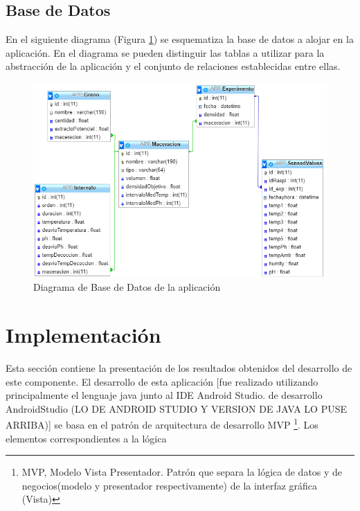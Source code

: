     \subsection{Base de Datos}
        \par En el siguiente diagrama (Figura \ref{fig:DiagramaBdApp}) se esquematiza la base de datos a alojar en la aplicación. En el diagrama se pueden distinguir las tablas a utilizar para la abstracción de la aplicación y el conjunto de relaciones establecidas entre ellas.
        
        \begin{figure}[h]
            \centering
            \includegraphics[scale=0.8]{DiagramaBaseDeDatosAPP.jpg}
            \caption{Diagrama de Base de Datos de la aplicación}
            \label{fig:DiagramaBdApp}
        \end{figure}

\section{Implementación}
    \par Esta sección contiene la presentación de los resultados obtenidos del desarrollo de este componente. 
    El desarrollo de esta aplicación [fue realizado utilizando principalmente el lenguaje java junto al IDE  Android Studio.
    de desarrollo AndroidStudio (LO DE ANDROID STUDIO Y VERSION DE JAVA LO PUSE ARRIBA)] se basa en el patrón de arquitectura de desarrollo MVP \footnote{MVP, Modelo Vista Presentador. Patrón que separa la lógica de datos y de negocios(modelo y presentador respectivamente) de la interfaz gráfica (Vista)}. Los elementos correspondientes a la lógica    
    


